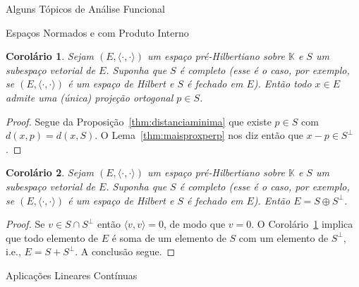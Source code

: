 \documentclass[oneside,final,11pt]{amsbook}
\newcommand{\K}{\mathds K}
\theoremstyle{remark}\newtheorem{exercise}{Exercício}[chapter]
\theoremstyle{remark}\newtheorem{*exercise}[exercise]{\hbox to 0pt{\hskip 0pt minus 1fil*}Exercício}
\theoremstyle{definition}\newtheorem{exdefin}{Definição}[chapter]
\theoremstyle{plain}\newtheorem{teo}{Teorema}[section]
\theoremstyle{plain}\newtheorem{lem}[teo]{Lema}
\theoremstyle{plain}\newtheorem{prop}[teo]{Proposição}
\theoremstyle{plain}\newtheorem{cor}[teo]{Corolário}
\theoremstyle{definition}\newtheorem{defin}[teo]{Definição}
\theoremstyle{remark}\newtheorem{rem}[teo]{Observação}
\theoremstyle{definition}\newtheorem{notation}[teo]{Notação}
\theoremstyle{definition}\newtheorem{convention}[teo]{Convenção}
\theoremstyle{definition}\newtheorem{example}[teo]{Exemplo}
\numberwithin{section}{chapter}
\numberwithin{equation}{section}
\begin{document}
\begin{chapter}{Alguns Tópicos de Análise Funcional}
\begin{section}{Espaços Normados e com Produto Interno}
\begin{cor}\label{thm:existeprojort}
Sejam $(E,\langle\cdot,\cdot\rangle)$ um espaço pré-Hilbertiano sobre $\K$ e $S$ um subespaço vetorial de $E$.
Suponha que $S$ é completo (esse é o caso, por exemplo, se $(E,\langle\cdot,\cdot\rangle)$ é um espaço de Hilbert
e $S$ é fechado em $E$). Então todo $x\in E$ admite uma (única) projeção ortogonal $p\in S$.
\end{cor}
\begin{proof}
Segue da Proposição~\ref{thm:distanciaminima} que existe $p\in S$ com $d(x,p)=d(x,S)$.
O Lema~\ref{thm:maisproxperp} nos diz então que $x-p\in S^\perp$.
\end{proof}

\begin{cor}\label{thm:cosSoplusSperp}
Sejam $(E,\langle\cdot,\cdot\rangle)$ um espaço pré-Hilbertiano sobre $\K$ e $S$ um subespaço vetorial de $E$.
Suponha que $S$ é completo (esse é o caso, por exemplo, se $(E,\langle\cdot,\cdot\rangle)$ é um espaço de Hilbert
e $S$ é fechado em $E$). Então $E=S\oplus S^\perp$.
\end{cor}
\begin{proof}
Se $v\in S\cap S^\perp$ então $\langle v,v\rangle=0$, de modo que $v=0$. O Corolário~\ref{thm:existeprojort}
implica que todo elemento de $E$ é soma de um elemento de $S$ com um elemento de $S^\perp$, i.e., $E=S+S^\perp$.
A conclusão segue.
\end{proof}

\end{section}

\begin{section}{Aplicações Lineares Contínuas}


\end{section}
\end{chapter}
\end{document}
